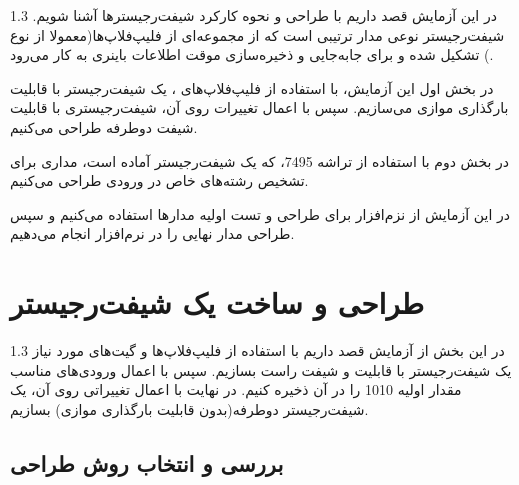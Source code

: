 \documentclass[a4paper,12pt]{article}
\numberwithin{figure}{subsection}
\begin{document}
\begin{spacing}{1.3} 
در این آزمایش قصد داریم با طراحی و نحوه کارکرد شیفت‌رجیسترها آشنا شویم.
شیفت‌رجیستر نوعی مدار ترتیبی است که از مجموعه‌ای از فلیپ‌فلاپ‌ها(معمولا از نوع ) تشکیل شده و برای جابه‌جایی و ذخیره‌سازی موقت اطلاعات باینری به کار می‌رود.

در بخش اول این آزمایش، با استفاده از فلیپ‌فلاپ‌های ، یک شیفت‌رجیستر با قابلیت بارگذاری موازی می‌سازیم. سپس با اعمال تغییرات روی آن، شیفت‌رجیستری با قابلیت شیفت دوطرفه طراحی می‌کنیم.

در بخش دوم با استفاده از تراشه 7495، که یک شیفت‌رجیستر آماده است، مداری برای تشخیص رشته‌های خاص در ورودی طراحی می‌کنیم.

در این آزمایش از نزم‌افزار  برای طراحی و تست اولیه مدارها استفاده می‌کنیم و سپس طراحی مدار نهایی را در نرم‌افزار  انجام می‌دهیم.
\end{spacing}


\newpage

\section{طراحی و ساخت یک شیفت‌رجیستر}
	\leavevmode\par
	\vspace{0.3cm}
	
	\begin{spacing}{1.3} 
در این بخش از آزمایش قصد داریم با استفاده از فلیپ‌فلاپ‌ها و گیت‌های مورد نیاز یک شیفت‌رجیستر با قابلیت  و شیفت راست بسازیم. سپس با اعمال ورودی‌های مناسب مقدار اولیه 1010 را در آن ذخیره کنیم. در نهایت با اعمال تغییراتی روی آن، یک شیفت‌رجیستر دوطرفه(بدون قابلیت بارگذاری موازی) بسازیم.
\end{spacing}


\subsection{بررسی و انتخاب روش طراحی}
\leavevmode\par
\vspace{0.2cm}
	
\end{document}
